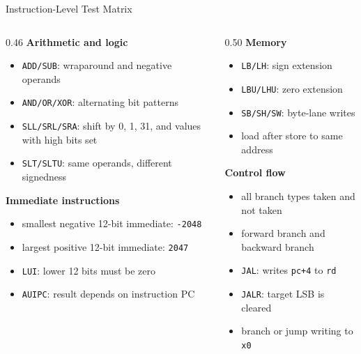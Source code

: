 \documentclass[aspectratio=169,10pt]{beamer}
\begin{document}
\begin{frame}{Instruction-Level Test Matrix}
  \small
  \begin{columns}[T]
    \begin{column}{0.46\textwidth}
      \textbf{Arithmetic and logic}
      \begin{itemize}
        \item \texttt{ADD/SUB}: wraparound and negative operands
        \item \texttt{AND/OR/XOR}: alternating bit patterns
        \item \texttt{SLL/SRL/SRA}: shift by 0, 1, 31, and values with high bits set
        \item \texttt{SLT/SLTU}: same operands, different signedness
      \end{itemize}

      \vspace{0.6em}
      \textbf{Immediate instructions}
      \begin{itemize}
        \item smallest negative 12-bit immediate: \texttt{-2048}
        \item largest positive 12-bit immediate: \texttt{2047}
        \item \texttt{LUI}: lower 12 bits must be zero
        \item \texttt{AUIPC}: result depends on instruction PC
      \end{itemize}
    \end{column}
    \begin{column}{0.50\textwidth}
      \textbf{Memory}
      \begin{itemize}
        \item \texttt{LB/LH}: sign extension
        \item \texttt{LBU/LHU}: zero extension
        \item \texttt{SB/SH/SW}: byte-lane writes
        \item load after store to same address
      \end{itemize}

      \vspace{0.6em}
      \textbf{Control flow}
      \begin{itemize}
        \item all branch types taken and not taken
        \item forward branch and backward branch
        \item \texttt{JAL}: writes \texttt{pc+4} to \texttt{rd}
        \item \texttt{JALR}: target LSB is cleared
        \item branch or jump writing to \texttt{x0}
      \end{itemize}
    \end{column}
  \end{columns}
\end{frame}
\end{document}

